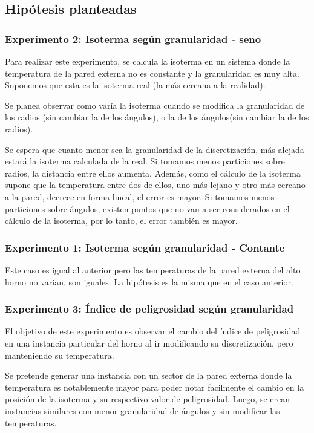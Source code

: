   \subsection{Hipótesis planteadas}

  	\subsubsection*{Experimento 2: Isoterma según granularidad - seno}
  	Para realizar este experimento, se calcula la isoterma en un sistema donde la temperatura de la pared externa no es constante y la granularidad es muy alta. Suponemos que esta es la isoterma real (la más cercana a la realidad). 

  	Se planea observar como varía la isoterma cuando se modifica la granularidad de los radios (sin cambiar la de los ángulos), o la de los ángulos(sin cambiar la de los radios).

    Se espera que cuanto menor sea la granularidad de la discretización, más alejada estará la isoterma calculada de la real. Si tomamos menos particiones sobre radios, la distancia entre ellos aumenta. Además, como el cálculo de la isoterma supone que la temperatura entre dos de ellos, uno más lejano y otro más cercano a la pared, decrece en forma lineal, el error es mayor. Si tomamos menos particiones sobre ángulos, existen puntos que no van a ser considerados en el cálculo de la isoterma, por lo tanto, el error también es mayor.

    \subsubsection*{Experimento 1: Isoterma según granularidad - Contante}
    Este caso es igual al anterior pero las temperaturas de la pared externa del alto horno no varian, son iguales. La hipótesis es la misma que en el caso anterior.

  	\subsubsection*{Experimento 3: Índice de peligrosidad según granularidad}
  	El objetivo de este experimento es observar el cambio del índice de peligrosidad en una instancia particular del horno al ir modificando su discretización, pero manteniendo su temperatura. 

  	Se pretende generar una instancia con un sector de la pared externa donde la temperatura es notablemente mayor para poder notar facilmente el cambio en la posición de la isoterma y su respectivo valor de peligrosidad. Luego, se crean instancias similares con menor granularidad de ángulos y sin modificar las temperaturas. 

